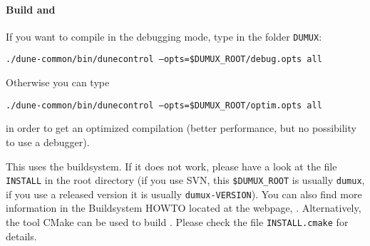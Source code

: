 % 
% 

\paragraph{Build \Dune and \Dumux}
\label{buildIt}
If you want to compile in the debugging mode, type in the folder \texttt{DUMUX}: 
\begin{center}
\texttt{./dune-common/bin/dunecontrol --opts=\$DUMUX\_ROOT/debug.opts all}
\end{center}

Otherwise you can type
\begin{center}
\texttt{./dune-common/bin/dunecontrol --opts=\$DUMUX\_ROOT/optim.opts all}
\end{center}
in order to get an optimized compilation (better performance, but no possibility to use a debugger).

This uses the \Dune buildsystem. If it does not work, please have a look at the file \texttt{INSTALL} in the \Dumux root directory (if you use SVN, this \texttt{\$DUMUX\_ROOT} is usually \texttt{dumux}, if you use a released version it is usually \texttt{dumux-VERSION}). You can also find more information in the \Dune Buildsystem HOWTO located at the \Dune webpage, \cite{DUNE-HP}.  Alternatively, the tool CMake can be used to build \Dumux. Please check the file \texttt{INSTALL.cmake} for details.

